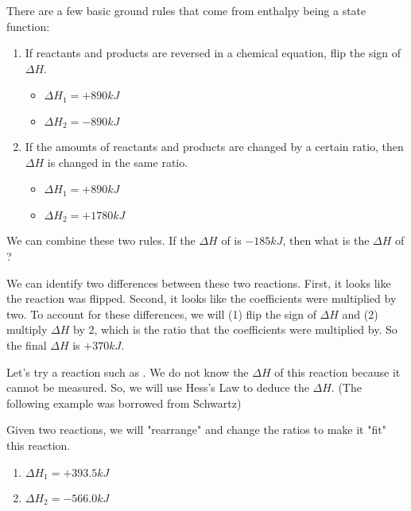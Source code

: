 \documentclass[letterpaper, 12pt]{article}
\begin{document}
There are a few basic ground rules that come from enthalpy being a state function:
\begin{enumerate}
	\item If reactants and products are reversed in a chemical equation, flip the sign of $\Delta H$.
	\begin{itemize}
		\item {} $\Delta H_{1} = +890 kJ$
		\item {} $\Delta H_{2} = -890 kJ$
	\end{itemize}
	\item If the amounts of reactants and products are changed by a certain ratio, then $\Delta H$ is changed in the same ratio.
	\begin{itemize}
		\item {} $\Delta H_{1} = +890 kJ$
		\item {} $\Delta H_{2} = +1780 kJ$
	\end{itemize}
\end{enumerate}

We can combine these two rules. If the $\Delta H$ of  is $-185 kJ$, then what is the $\Delta H$ of ?

We can identify two differences between these two reactions. First, it looks like the reaction was flipped. Second, it looks like the coefficients were multiplied by two. To account for these differences, we will (1) flip the sign of $\Delta H$ and (2) multiply $\Delta H$ by 2, which is the ratio that the coefficients were multiplied by. So the final $\Delta H$ is $+370 kJ$.

Let's try a reaction such as . We do not know the $\Delta H$ of this reaction because it cannot be measured. So, we will use Hess's Law to deduce the $\Delta H$. (The following example was borrowed from Schwartz)

Given two reactions, we will "rearrange" and change the ratios to make it "fit" this reaction.

\begin{enumerate}
	\item {} $\Delta H_{1} = +393.5 kJ$
	\item {} $\Delta H_{2} = -566.0 kJ$
\end{enumerate}
\end{document}
